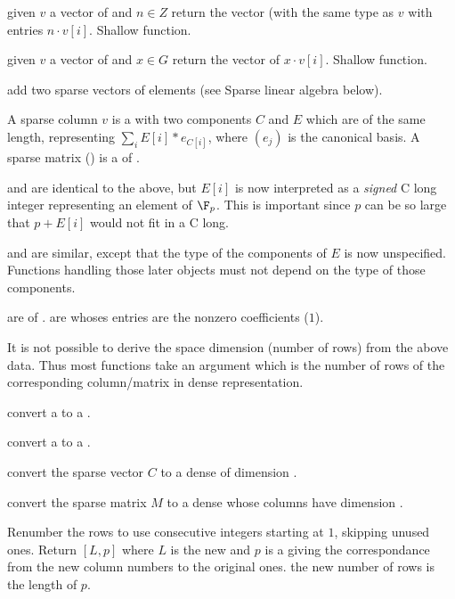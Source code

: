  given $v$ a vector of  and $n\in
Z$ return the vector (with the same type as $v$ with entries $n \cdot v[i]$.
Shallow function.

 given $v$ a vector of  and $x\in
G$ return the vector of $x \cdot v[i]$. Shallow function.

 add two sparse vectors of
 elements (see Sparse linear algebra below).


A sparse column  $v$ is a  with two components $C$ and $E$
which are  of the same length, representing $\sum_i
E[i]*e_{C[i]}$, where $(e_j)$ is the canonical basis. A sparse matrix
() is a  of .

 and  are identical to the above, but $E[i]$ is now
interpreted as a \emph{signed} C long integer representing an element of
$\F_p$. This is important since $p$ can be so large that $p+E[i]$ would not
fit in a C long.

 and  are similar, except that the type of the components
of $E$ is now unspecified. Functions handling those later objects
must not depend on the type of those components.

 are  of .  are  whoses
entries are the nonzero coefficients ($1$).

It is not possible to derive the space dimension (number of rows) from the
above data. Thus most functions take an argument  which is the
number of rows of the corresponding column/matrix in dense representation.

 convert a  to a .

 convert a  to a .

 convert the sparse vector $C$
to a dense  of dimension .

 convert the sparse matrix $M$
to a dense  whose columns have dimension .

Renumber the rows to use consecutive integers starting at $1$, skipping unused ones.
Return $[L,p]$ where $L$ is the new  and $p$ is a  giving
the correspondance from the new column numbers to the original ones.
the new number of rows is the length of $p$.

